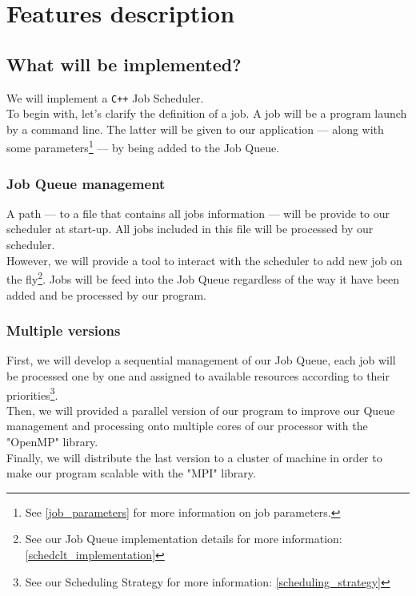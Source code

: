 \documentclass[a4paper,11pt]{article}
\begin{document}
\newpage

\section{Features description}

\subsection{What will be implemented?}

We will implement a \texttt{C++} Job Scheduler.\\
To begin with, let's clarify the definition of a job.
A job will be a program launch by a command line. The latter will be given to our application --- along with some parameters\footnote{See \ref{job_parameters} for more information on job parameters.} --- by being added to the Job Queue.

\subsubsection{Job Queue management}

A path --- to a file that contains all jobs information --- will be provide to our scheduler at start-up. All jobs included in this file will be processed by our scheduler.\\ However, we will provide a tool to interact with the scheduler to add new job on the fly\footnote{See our Job Queue implementation details for more information: \ref{schedclt_implementation}}.
Jobs will be feed into the Job Queue regardless of the way it have been added and be processed by our program.

\subsubsection{Multiple versions}

First, we will develop a sequential management of our Job Queue, each job will be processed one by one and assigned to available resources according to their priorities\footnote{See our Scheduling Strategy for more information: \ref{scheduling_strategy}}.\\
Then, we will provided a parallel version of our program to improve our Queue management and processing onto multiple cores of our processor with the "OpenMP" library.\\
Finally, we will distribute the last version to a cluster of machine in order to make our program scalable with the "MPI" library.
\end{document}
